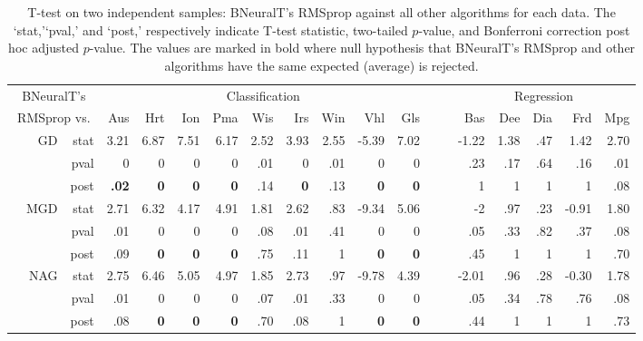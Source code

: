 \documentclass[11pt,a4paper]{article}
\begin{document}
    
    
    \begin{table} \small
        \centering
        \renewcommand{\arraystretch}{1.05}
        \setlength{\tabcolsep}{2pt}
        \caption{T-test on two independent samples: BNeuralT's RMSprop against all other algorithms for each data. The `stat,'`pval,' and `post,' respectively indicate T-test statistic, two-tailed $p$-value, and Bonferroni correction post hoc adjusted $p$-value. The values are marked in bold where null hypothesis that BNeuralT's RMSprop and other algorithms have the same expected (average) is rejected.}
        \label{tab:BNeuralT_RMSprop_VS_All_T_Test}
        \begin{tabular}[t]{lrrrrrrrrrrrrrrrrr}
            \toprule
            \multicolumn{3}{c}{BNeuralT's} & \multicolumn{9}{c}{Classification} & ~~ & \multicolumn{5}{c}{Regression} \\
            \cline{4-12}\cline{14-18}
            \multicolumn{3}{c}{RMSprop vs.}  & Aus & Hrt & Ion & Pma & Wis & Irs & Win & Vhl & Gls & ~ & Bas & Dee & Dia & Frd & Mpg \\
            \midrule
            \parbox[t]{3mm}{}
            & GD & stat & 3.21 & 6.87 & 7.51 & 6.17 & 2.52 & 3.93 & 2.55 & -5.39 & 7.02 &  & -1.22 & 1.38 & .47 & 1.42 & 2.70 \\
            &  & pval & 0 & 0 & 0 & 0 & .01 & 0 & .01 & 0 & 0 &  & .23 & .17 & .64 & .16 & .01 \\
            &  & post & \textbf{.02} & \textbf{0} & \textbf{0} & \textbf{0} & .14 & \textbf{0} & .13 & \textbf{0} & \textbf{0} &  & 1 & 1 & 1 & 1 & .08 \\
& MGD & stat & 2.71 & 6.32 & 4.17 & 4.91 & 1.81 & 2.62 & .83 & -9.34 & 5.06 &  & -2 & .97 & .23 & -0.91 & 1.80 \\
            &  & pval & .01 & 0 & 0 & 0 & .08 & .01 & .41 & 0 & 0 &  & .05 & .33 & .82 & .37 & .08 \\
            &  & post & .09 & \textbf{0} & \textbf{0} & \textbf{0} & .75 & .11 & 1 & \textbf{0} & \textbf{0} &  & .45 & 1 & 1 & 1 & .70 \\
& NAG & stat & 2.75 & 6.46 & 5.05 & 4.97 & 1.85 & 2.73 & .97 & -9.78 & 4.39 &  & -2.01 & .96 & .28 & -0.30 & 1.78 \\
            &  & pval & .01 & 0 & 0 & 0 & .07 & .01 & .33 & 0 & 0 &  & .05 & .34 & .78 & .76 & .08 \\
            &  & post & .08 & \textbf{0} & \textbf{0} & \textbf{0} & .70 & .08 & 1 & \textbf{0} & \textbf{0} &  & .44 & 1 & 1 & 1 & .73 \\

\end{tabular}
\end{table}
\end{document}
